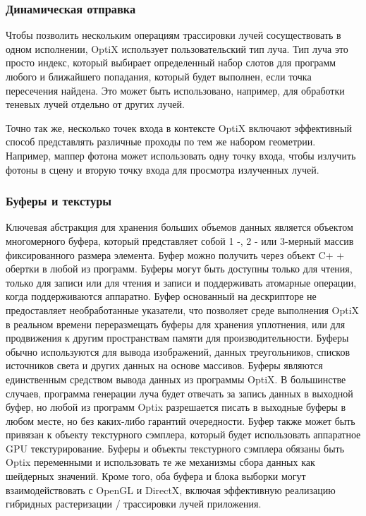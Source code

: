 \subsubsection {Динамическая отправка}
Чтобы позволить нескольким операциям трассировки лучей сосуществовать в одном исполнении, OptiX использует пользовательский тип луча.
Тип луча это просто индекс, который выбирает определенный набор слотов для программ любого и ближайшего попадания, который будет выполнен, если точка пересечения найдена.
Это может быть использовано, например, для обработки теневых лучей отдельно от других лучей.

Точно так же, несколько точек входа в контексте OptiX включают эффективный способ представлять различные проходы по тем же набором геометрии.
Например, маппер фотона может использовать одну точку входа, чтобы излучить фотоны в сцену и вторую точку входа для просмотра излученных лучей.

\subsubsection{Буферы и текстуры}
Ключевая абстракция для хранения больших объемов данных является объектом многомерного буфера, который представляет собой 1 -, 2 - или 3-мерный массив фиксированного размера элемента.
Буфер можно получить через объект C+ + обертки в любой из программ.
Буферы могут быть доступны только для чтения, только для записи или для чтения и записи и поддерживать атомарные операции, когда поддерживаются аппаратно.
Буфер основанный на дескрипторе не предоставляет необработанные указатели, что позволяет среде выполнения OptiX в реальном времени переразмещать буферы для хранения уплотнения, или для продвижения к другим пространствам памяти для производительности.
Буферы обычно используются для вывода изображений, данных треугольников, списков источников света и других данных на основе массивов.
Буферы являются единственным средством вывода данных из программы OptiX.
В большинстве случаев, программа генерации луча будет отвечать за запись данных в выходной буфер, но любой из программ Optix разрешается писать в выходные буферы в любом месте, но без каких-либо гарантий очередности.
Буфер также может быть привязан к объекту текстурного сэмплера, который будет использовать аппаратное GPU текстурирование.
Буферы и объекты текстурного сэмплера обязаны быть Optix переменными и использовать те же механизмы сбора данных как шейдерных значений.
Кроме того, оба буфера и блока выборки могут взаимодействовать с OpenGL и DirectX, включая эффективную реализацию гибридных растеризации / трассировки лучей приложения.


